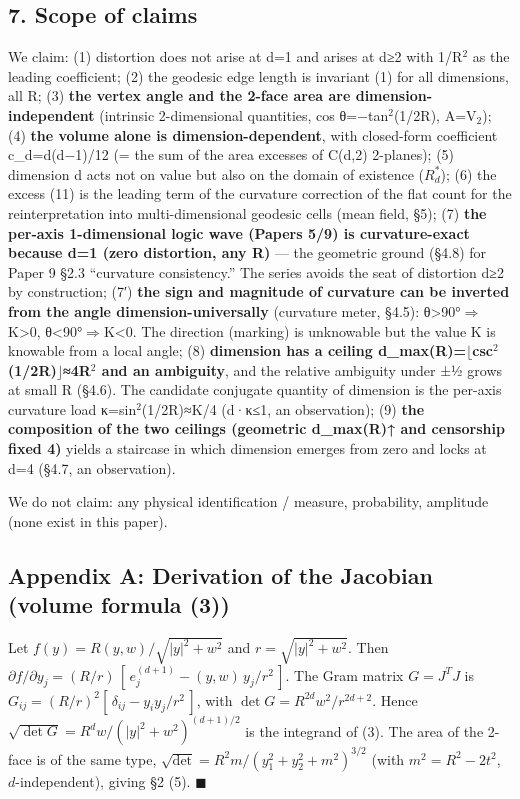 \documentclass[
]{ltjsarticle}
\newcounter{none} %
\begin{document}
\subsection{7. Scope of claims}\label{scope-of-claims}

We claim: (1) distortion does not arise at d=1 and arises at d≥2 with
1/R\(^{2}\) as the leading coefficient; (2) the geodesic edge length is
invariant (1) for all dimensions, all R; (3) \textbf{the vertex angle
and the 2-face area are dimension-independent} (intrinsic 2-dimensional
quantities, cos θ=−tan\(^{2}\)(1/2R), A=V\(_{2}\)); (4) \textbf{the
volume alone is dimension-dependent}, with closed-form coefficient
c\_d=d(d−1)/12 (= the sum of the area excesses of C(d,2) 2-planes); (5)
dimension d acts not on value but also on the domain of existence
(\(R^{*}_{d}\)); (6) the excess (11) is the leading term of the
curvature correction of the flat count for the reinterpretation into
multi-dimensional geodesic cells (mean field, §5); (7) \textbf{the
per-axis 1-dimensional logic wave (Papers 5/9) is curvature-exact
because d=1 (zero distortion, any R)} --- the geometric ground (§4.8)
for Paper 9 §2.3 ``curvature consistency.'' The series avoids the seat
of distortion d≥2 by construction; (7′) \textbf{the sign and magnitude
of curvature can be inverted from the angle dimension-universally}
(curvature meter, §4.5):
θ\textgreater90°\(\Longrightarrow\)K\textgreater0,
θ\textless90°\(\Longrightarrow\)K\textless0. The direction (marking) is
unknowable but the value K is knowable from a local angle; (8)
\textbf{dimension has a ceiling
d\_max(R)=\(\lfloor\)csc\(^{2}\)(1/2R)\(\rfloor\)≈4R\(^{2}\) and an
ambiguity}, and the relative ambiguity under ±½ grows at small R (§4.6).
The candidate conjugate quantity of dimension is the per-axis curvature
load κ=sin\(^{2}\)(1/2R)≈K/4 (d·κ≤1, an observation); (9) \textbf{the
composition of the two ceilings (geometric d\_max(R)↑ and censorship
fixed 4)} yields a staircase in which dimension emerges from zero and
locks at d=4 (§4.7, an observation).

We do not claim: any physical identification / measure, probability,
amplitude (none exist in this paper).

\subsection{Appendix A: Derivation of the Jacobian (volume formula
(3))}\label{appendix-a-derivation-of-the-jacobian-volume-formula-3}

Let \(f(y)=R(y,w)/\sqrt{|y|^2+w^2}\) and \(r=\sqrt{|y|^2+w^2}\). Then
\(\partial f/\partial y_j=(R/r)\,[\,e_j^{(d+1)} - (y,w)\,y_j/r^2\,]\).
The Gram matrix \(G=J^{T}J\) is
\(G_{ij}=(R/r)^2[\,\delta_{ij} - y_i y_j/r^2\,]\), with
\(\det G=R^{2d}w^2/r^{2d+2}\). Hence
\(\sqrt{\det G}=R^{d}w/(|y|^2+w^2)^{(d+1)/2}\) is the integrand of (3).
The area of the 2-face is of the same type,
\(\sqrt{\det}=R^2 m/(y_1^2+y_2^2+m^2)^{3/2}\) (with \(m^2=R^2-2t^2\),
\(d\)-independent), giving §2 (5). \(\blacksquare\)
\end{document}
